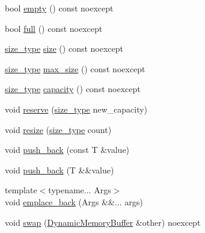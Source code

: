 \begin{DoxyCompactItemize}
\item 
bool \mbox{\hyperlink{classmage_1_1_dynamic_memory_buffer_aca99040ae14a82553dd9222a3ca71fc5}{empty}} () const noexcept
\item 
bool \mbox{\hyperlink{classmage_1_1_dynamic_memory_buffer_a8d4582966edb75250c2dea5917108d76}{full}} () const noexcept
\item 
\mbox{\hyperlink{classmage_1_1_dynamic_memory_buffer_a45d02825da2b18fd7c24965ed5f46a30}{size\+\_\+type}} \mbox{\hyperlink{classmage_1_1_dynamic_memory_buffer_a03cff83d88ddef07593b3864d384f77e}{size}} () const noexcept
\item 
\mbox{\hyperlink{classmage_1_1_dynamic_memory_buffer_a45d02825da2b18fd7c24965ed5f46a30}{size\+\_\+type}} \mbox{\hyperlink{classmage_1_1_dynamic_memory_buffer_ae7daa0e16fc5ac33817f2af79fa72fc9}{max\+\_\+size}} () const noexcept
\item 
\mbox{\hyperlink{classmage_1_1_dynamic_memory_buffer_a45d02825da2b18fd7c24965ed5f46a30}{size\+\_\+type}} \mbox{\hyperlink{classmage_1_1_dynamic_memory_buffer_a58b0b92f2d7173b616bac7f5528a7aee}{capacity}} () const noexcept
\item 
void \mbox{\hyperlink{classmage_1_1_dynamic_memory_buffer_ada4cea21561e02a8fe29e3da1462c678}{reserve}} (\mbox{\hyperlink{classmage_1_1_dynamic_memory_buffer_a45d02825da2b18fd7c24965ed5f46a30}{size\+\_\+type}} new\+\_\+capacity)
\item 
void \mbox{\hyperlink{classmage_1_1_dynamic_memory_buffer_a516a63af722f07dc01df704a4ab0ff43}{resize}} (\mbox{\hyperlink{classmage_1_1_dynamic_memory_buffer_a45d02825da2b18fd7c24965ed5f46a30}{size\+\_\+type}} count)
\item 
void \mbox{\hyperlink{classmage_1_1_dynamic_memory_buffer_a4e39904de42e3e88b4dadd8490c2c56a}{push\+\_\+back}} (const T \&value)
\item 
void \mbox{\hyperlink{classmage_1_1_dynamic_memory_buffer_ad7f025039f7ae939a3d16c5aead6abbe}{push\+\_\+back}} (T \&\&value)
\item 
{\footnotesize template$<$typename... Args$>$ }\\void \mbox{\hyperlink{classmage_1_1_dynamic_memory_buffer_a41f89f331e4d441650e6ed05d1bcc2d3}{emplace\+\_\+back}} (Args \&\&... args)
\item 
void \mbox{\hyperlink{classmage_1_1_dynamic_memory_buffer_a0d235c24e02e694f481a591dc803e508}{swap}} (\mbox{\hyperlink{classmage_1_1_dynamic_memory_buffer}{Dynamic\+Memory\+Buffer}} \&other) noexcept
\end{DoxyCompactItemize}
